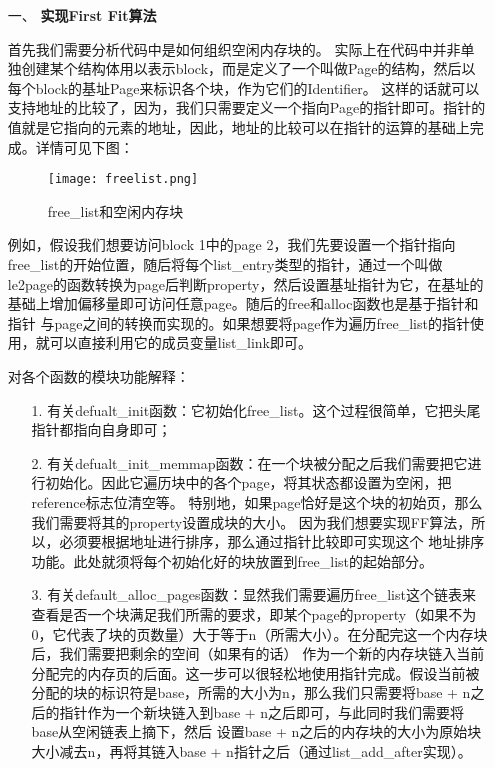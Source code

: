 \documentclass[UTF8, a4paper]{ctexart}
\begin{document}
\begin{enumerate}
    \item [一、] \textbf{实现First Fit算法}
    \par
    首先我们需要分析代码中是如何组织空闲内存块的。
    实际上在代码中并非单独创建某个结构体用以表示block，而是定义了一个叫做Page的结构，然后以每个block的基址Page来标识各个块，作为它们的Identifier。
    这样的话就可以支持地址的比较了，因为，我们只需要定义一个指向Page的指针即可。指针的值就是它指向的元素的地址，因此，地址的比较可以在指针的运算的基础上完成。详情可见下图：
    \begin{figure}[!htb]
        \centering
        \texttt{[image: freelist.png]}
        \label{fig:1}
        \caption{free\_list和空闲内存块}
    \end{figure}
    \par
    例如，假设我们想要访问block 1中的page 2，我们先要设置一个指针指向free\_list的开始位置，随后将每个list\_entry类型的指针，通过一个叫做
    le2page的函数转换为page后判断property，然后设置基址指针为它，在基址的基础上增加偏移量即可访问任意page。随后的free和alloc函数也是基于指针和指针
    与page之间的转换而实现的。如果想要将page作为遍历free\_list的指针使用，就可以直接利用它的成员变量list\_link即可。
    \par
    对各个函数的模块功能解释：
    \begin{enumerate}
        \item [1.] 有关defualt\_init函数：它初始化free\_list。这个过程很简单，它把头尾指针都指向自身即可；
        \item [2.] 有关defualt\_init\_memmap函数：在一个块被分配之后我们需要把它进行初始化。因此它遍历块中的各个page，将其状态都设置为空闲，把reference标志位清空等。
                   特别地，如果page恰好是这个块的初始页，那么我们需要将其的property设置成块的大小。 因为我们想要实现FF算法，所以，必须要根据地址进行排序，那么通过指针比较即可实现这个
                   地址排序功能。此处就须将每个初始化好的块放置到free\_list的起始部分。
        \item [3.] 有关default\_alloc\_pages函数：显然我们需要遍历free\_list这个链表来查看是否一个块满足我们所需的要求，即某个page的property（如果不为0，它代表了块的页数量）大于等于n（所需大小）。在分配完这一个内存块后，我们需要把剩余的空间（如果有的话）
                   作为一个新的内存块链入当前分配完的内存页的后面。这一步可以很轻松地使用指针完成。假设当前被分配的块的标识符是base，所需的大小为n，那么我们只需要将base + n之后的指针作为一个新块链入到base + n之后即可，与此同时我们需要将base从空闲链表上摘下，然后
                   设置base + n之后的内存块的大小为原始块大小减去n，再将其链入base + n指针之后（通过list\_add\_after实现）。

\end{enumerate}
\end{enumerate}
\end{document}
